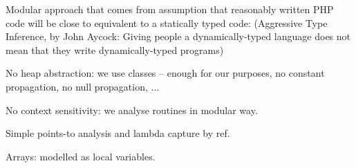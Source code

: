         \begin{itemize*}
            \item Modular approach that comes from assumption that 
                reasonably written PHP code will be close to equivalent to 
                a statically typed code: (Aggressive Type Inference, by John Aycock: Giving people 
                a dynamically-typed language does not mean that they write dynamically-typed programs)
                \begin{itemize*}
                    \item No heap abstraction: we use classes -- enough for our purposes, no constant propagation, no null propagation, ...
                    \item No context sensitivity: we analyse routines in modular way.
                    \item Simple points-to analysis and lambda capture by ref.
                    \item Arrays: modelled as local variables.
                \end{itemize*}
        \end{itemize*}
        

